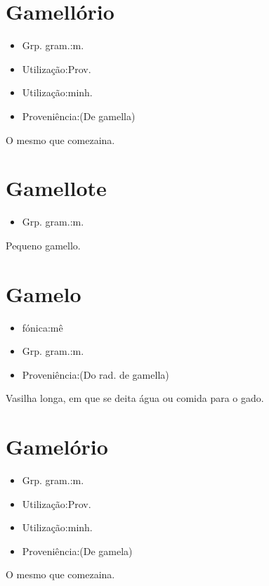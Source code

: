 \section{Gamellório}
\begin{itemize}
\item {Grp. gram.:m.}
\end{itemize}
\begin{itemize}
\item {Utilização:Prov.}
\end{itemize}
\begin{itemize}
\item {Utilização:minh.}
\end{itemize}
\begin{itemize}
\item {Proveniência:(De \textunderscore gamella\textunderscore )}
\end{itemize}
O mesmo que \textunderscore comezaina\textunderscore .
\section{Gamellote}
\begin{itemize}
\item {Grp. gram.:m.}
\end{itemize}
Pequeno gamello.
\section{Gamelo}
\begin{itemize}
\item {fónica:mê}
\end{itemize}
\begin{itemize}
\item {Grp. gram.:m.}
\end{itemize}
\begin{itemize}
\item {Proveniência:(Do rad. de \textunderscore gamella\textunderscore )}
\end{itemize}
Vasilha longa, em que se deita água ou comida para o gado.
\section{Gamelório}
\begin{itemize}
\item {Grp. gram.:m.}
\end{itemize}
\begin{itemize}
\item {Utilização:Prov.}
\end{itemize}
\begin{itemize}
\item {Utilização:minh.}
\end{itemize}
\begin{itemize}
\item {Proveniência:(De \textunderscore gamela\textunderscore )}
\end{itemize}
O mesmo que \textunderscore comezaina\textunderscore .
